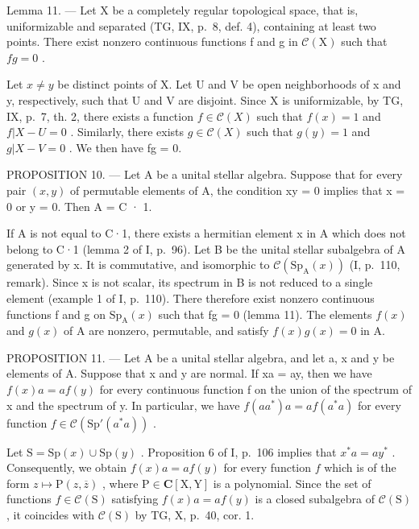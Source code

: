 Lemma 11. --- Let X be a completely regular topological space, that is, uniformizable and separated (TG, IX, p.~8, def. 4), containing at least two points. There exist nonzero continuous functions f and g in \(\mathcal{C}(\mathrm{X})\) such that \(fg = 0\) .

Let \(x \neq y\) be distinct points of X. Let U and V be open neighborhoods of x and y, respectively, such that U and V are disjoint. Since X is uniformizable, by TG, IX, p.~7, th. 2, there exists a function \(f \in \mathcal{C}(X)\) such that \(f(x) = 1\) and \(f|X - U = 0\) . Similarly, there exists \(g \in \mathcal{C}(X)\) such that \(g(y) = 1\) and \(g|X - V = 0\) . We then have fg = 0.

PROPOSITION 10. --- Let A be a unital stellar algebra. Suppose that for every pair \((x,y)\) of permutable elements of A, the condition xy = 0 implies that x = 0 or y = 0. Then A = C · 1.

If A is not equal to C·1, there exists a hermitian element x in A which does not belong to C·1 (lemma 2 of I, p.~96). Let B be the unital stellar subalgebra of A generated by x. It is commutative, and isomorphic to \(\mathcal{C}(\mathrm{Sp}_{\mathrm{A}}(x))\) (I, p.~110, remark). Since x is not scalar, its spectrum in B is not reduced to a single element (example 1 of I, p.~110). There therefore exist nonzero continuous functions f and g on \(\mathrm{Sp}_{\mathrm{A}}(x)\) such that fg = 0 (lemma 11). The elements \(f(x)\) and \(g(x)\) of A are nonzero, permutable, and satisfy \(f(x)g(x) = 0\) in A.

PROPOSITION 11. --- Let A be a unital stellar algebra, and let a, x and y be elements of A. Suppose that x and y are normal. If xa = ay, then we have \(f(x)a = af(y)\) for every continuous function f on the union of the spectrum of x and the spectrum of y. In particular, we have \(f(aa^{*})a = af(a^{*}a)\) for every function \(f \in \mathcal{C}(\mathrm{Sp}'(a^{*}a))\) .

Let \(\mathrm{S} = \mathrm{Sp}(x) \cup \mathrm{Sp}(y)\) . Proposition 6 of I, p.~106 implies that \(x^{*}a = ay^{*}\) . Consequently, we obtain \(f(x)a = af(y)\) for every function \(f\) which is of the form \(z \mapsto \mathrm{P}(z,\overline{z})\) , where \(\mathrm{P} \in \mathbf{C}[\mathrm{X},\mathrm{Y}]\) is a polynomial. Since the set of functions \(f \in \mathcal{C}(\mathrm{S})\) satisfying \(f(x)a = af(y)\) is a closed subalgebra of \(\mathcal{C}(\mathrm{S})\) , it coincides with \(\mathcal{C}(\mathrm{S})\) by TG, X, p.~40, cor. 1.

